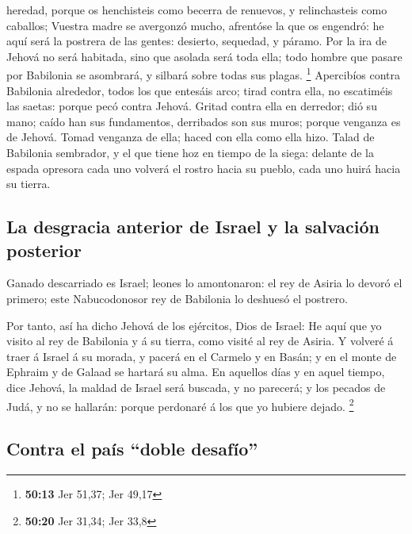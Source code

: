 heredad, porque os henchisteis como becerra de renuevos, y relinchasteis
como caballos;  Vuestra madre se avergonzó mucho, afrentóse
la que os engendró: he aquí será la postrera de las gentes: desierto,
sequedad, y páramo.  Por la ira de Jehová no será habitada,
sino que asolada será toda ella; todo hombre que pasare por Babilonia se
asombrará, y silbará sobre todas sus plagas. \footnote{\textbf{50:13}
  Jer 51,37; Jer 49,17}  Apercibíos contra Babilonia
alrededor, todos los que entesáis arco; tirad contra ella, no escatiméis
las saetas: porque pecó contra Jehová.  Gritad contra ella
en derredor; dió su mano; caído han sus fundamentos, derribados son sus
muros; porque venganza es de Jehová. Tomad venganza de ella; haced con
ella como ella hizo.  Talad de Babilonia sembrador, y el
que tiene hoz en tiempo de la siega: delante de la espada opresora cada
uno volverá el rostro hacia su pueblo, cada uno huirá hacia su tierra.

\hypertarget{la-desgracia-anterior-de-israel-y-la-salvaciuxf3n-posterior}{%
\subsection{La desgracia anterior de Israel y la salvación
posterior}\label{la-desgracia-anterior-de-israel-y-la-salvaciuxf3n-posterior}}

 Ganado descarriado es Israel; leones lo amontonaron: el
rey de Asiria lo devoró el primero; este Nabucodonosor rey de Babilonia
lo deshuesó el postrero.

 Por tanto, así ha dicho Jehová de los ejércitos, Dios de
Israel: He aquí que yo visito al rey de Babilonia y á su tierra, como
visité al rey de Asiria.  Y volveré á traer á Israel á su
morada, y pacerá en el Carmelo y en Basán; y en el monte de Ephraim y de
Galaad se hartará su alma.  En aquellos días y en aquel
tiempo, dice Jehová, la maldad de Israel será buscada, y no parecerá; y
los pecados de Judá, y no se hallarán: porque perdonaré á los que yo
hubiere dejado. \footnote{\textbf{50:20} Jer 31,34; Jer 33,8}

\hypertarget{contra-el-pauxeds-doble-desafuxedo}{%
\subsection{Contra el país ``doble
desafío''}\label{contra-el-pauxeds-doble-desafuxedo}}


